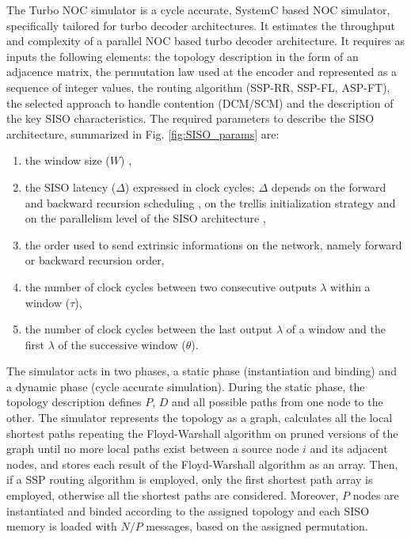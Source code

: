 \documentclass[10pt,twocolumn,journal]{IEEEtran}
\begin{document}
The Turbo NOC simulator \cite{turbo_NOC_download} is a cycle accurate, SystemC \cite{SystemC} based NOC simulator, 
specifically tailored 
for turbo decoder architectures. It estimates the throughput and complexity of a parallel NOC based turbo decoder 
architecture. It requires as inputs the following elements: 
the topology description in the form of an adjacence matrix, the permutation law 
used at the encoder and represented as a sequence of integer values, the routing algorithm 
(SSP-RR, SSP-FL, ASP-FT), the selected approach to handle contention (DCM/SCM) and the description of the key SISO characteristics. 
The required parameters to describe the SISO architecture, summarized in Fig. \ref{fig:SISO_params} are:  
\begin{enumerate}
\item the window size ($W$) \cite{benedetto_EL96},
\item the SISO latency ($\Delta$) expressed in clock cycles; $\Delta$ 
depends on the forward and backward recursion scheduling
\cite{parhi_ISCAS04}, on the trellis initialization strategy \cite{yao_ICASSP03} and on the parallelism 
level of the SISO architecture \cite{muller_ICCTA06},
\item the order used to send extrinsic informations on the network, namely forward or backward recursion 
order,
\item the number of clock cycles between two consecutive outputs $\lambda$ within a window ($\tau$), 
\item the number of clock cycles between the last output $\lambda$ of a window and the first $\lambda$ 
of the successive window ($\theta$).
\end{enumerate}
The simulator acts in two phases, a static phase (instantiation and binding) and a dynamic phase 
(cycle accurate simulation).
During the static phase, the topology description defines $P$, $D$ and all possible paths from one node to the other. 
The simulator represents the topology as a graph, calculates all the local shortest paths repeating the Floyd-Warshall 
algorithm on pruned versions of the graph until no more local paths exist between a source node $i$ and its adjacent 
nodes, and stores each result of the Floyd-Warshall algorithm as an array.
Then, if a SSP routing algorithm is employed, only the first shortest path array is employed, otherwise all the shortest 
paths are considered. 
Moreover, $P$ nodes are instantiated and binded according to the assigned topology and each SISO memory is loaded 
with $N/P$ messages, based on the assigned permutation. 
\end{document}
